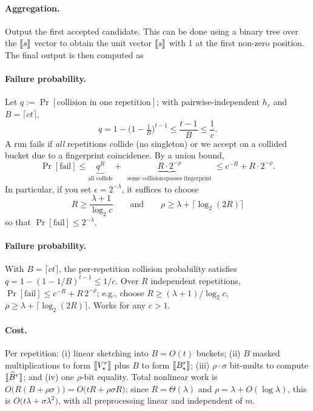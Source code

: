 \paragraph{Aggregation.} Output the first accepted candidate. This can be done using a binary tree over the $\share{s}$ vector to obtain the unit vector $\share{s}$ with 1 at the first non-zero position. The final output is then computed as

\paragraph{Failure probability.}
Let $q:=\Pr[\text{collision in one repetition}]$; with pairwise-independent $h_r$ and $B=\lceil c t\rceil$,
\[
q  = 1-\Big(1-\tfrac{1}{B}\Big)^{t-1}  \le \frac{t-1}{B}  \le \frac{1}{c}.
\]
A run fails if \emph{all} repetitions collide (no singleton) or we accept on a collided bucket
due to a fingerprint coincidence. By a union bound,
\[
\Pr[\text{fail}]
 \le \underbrace{q^R}_{\text{all collide}}
 +\
\underbrace{R\cdot 2^{-\rho}}_{\substack{\text{some collision}s\text{passes fingerprint}}}
 \le c^{-R}  + R\cdot 2^{-\rho}.
\]
In particular, if you set $\epsilon=2^{-\lambda}$, it suffices to choose
\[
R  \ge \frac{\lambda+1}{\log_2 c}
\qquad\text{and}\qquad
\rho  \ge \lambda + \big\lceil \log_2(2R)\big\rceil
\]
so that $\Pr[\text{fail}] \le 2^{-\lambda}$.




\paragraph{Failure probability.}
With $B=\lceil c t\rceil$, the per-repetition collision probability satisfies
\(
q = 1-(1-1/B)^{t-1}\le 1/c.
\)
Over $R$ independent repetitions,
\(\Pr[\text{fail}]\le c^{-R}+R\,2^{-\rho}\); e.g., choose
\(R\ge (\lambda+1)/\log_2 c\), \(\rho\ge \lambda+\lceil\log_2(2R)\rceil\). Works for any \(c>1\).






\paragraph{Cost.}
Per repetition:
(i) linear sketching into $B=O(t)$ buckets;
(ii) $B$ masked multiplications to form $\share{V^{r}_\star}$ plus $B$ to form $\share{B^{r}_\star}$;
(iii) $\rho\cdot \sigma$ bit-mults to compute $\share{\widehat{B}^{r}}$; and
(iv) one $\rho$-bit equality.
Total nonlinear work is $O\!\big(R(B+\rho \sigma)\big)=O\!\big(tR+\rho \sigma R\big)$;
since $R=\Theta(\lambda)$ and $\rho=\lambda+O(\log\lambda)$, this is $O\!\big(t\lambda + \sigma\lambda^2\big)$,
with all preprocessing linear and independent of $m$.


